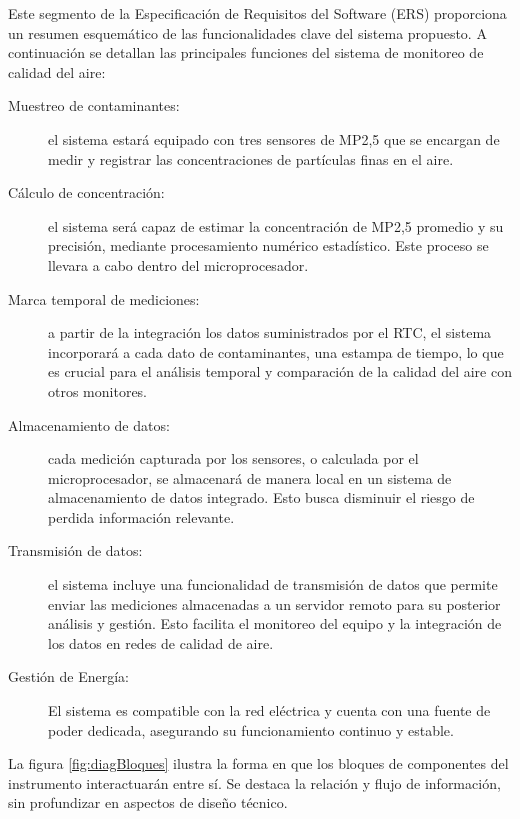 \documentclass[
11pt, %
codirector, %
]{charter}
\begin{document}
Este segmento de la Especificación de Requisitos del Software (ERS) proporciona un resumen esquemático de las funcionalidades clave del sistema propuesto. A continuación se detallan las principales funciones del sistema de monitoreo de calidad del aire:

\begin{description}
	\item[Muestreo de contaminantes:] el sistema estará equipado con tres sensores de MP2,5 que se encargan de medir y registrar las concentraciones de partículas finas en el aire.
	
	\item[Cálculo de concentración:] el sistema será capaz de estimar la concentración de MP2,5 promedio y su precisión, mediante procesamiento numérico estadístico. Este proceso se llevara a cabo dentro del microprocesador.
	
	\item[Marca temporal de mediciones:] a partir de la integración los datos suministrados por el RTC, el sistema incorporará a cada dato de contaminantes, una estampa de tiempo, lo que es crucial para el análisis temporal y comparación de la calidad del aire con otros monitores.

	\item[Almacenamiento de datos:] cada medición capturada por los sensores, o calculada por el microprocesador, se almacenará de manera local en un sistema de almacenamiento de datos integrado. Esto busca disminuir el riesgo de perdida información relevante.

	\item[Transmisión de datos:] el sistema incluye una funcionalidad de transmisión de datos que permite enviar las mediciones almacenadas a un servidor remoto para su posterior análisis y gestión. Esto facilita el monitoreo del equipo y la integración de los datos en redes de calidad de aire.

	\item[Gestión de Energía:] El sistema es compatible con la red eléctrica y cuenta con una fuente de poder dedicada, asegurando su funcionamiento continuo y estable.
	
\end{description}

La figura \ref{fig:diagBloques} ilustra la forma en que los bloques de componentes del instrumento interactuarán entre sí. Se destaca la relación y flujo de información, sin profundizar en aspectos de diseño técnico.
\end{document}

